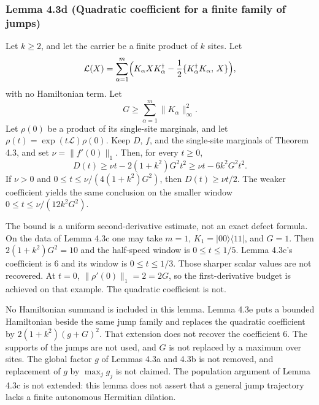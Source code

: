 \documentclass[
  11pt,
]{article}
\begin{document}
\subsubsection{Lemma 4.3d (Quadratic coefficient for a finite family of jumps)}\label{lemma-4.3d-quadratic-coefficient-for-a-finite-family-of-jumps}

Let \(k\ge 2\), and let the carrier be a finite product of \(k\) sites. Let
\[
\mathcal L(X)
=\sum_{\alpha=1}^{m}
\Bigl(
K_\alpha X K_\alpha^\dagger
-\frac12\{K_\alpha^\dagger K_\alpha,\,X\}
\Bigr),
\]
with no Hamiltonian term. Let
\[
G\ge\sum_{\alpha=1}^{m}\|K_\alpha\|_\infty^2.
\]
Let \(\rho(0)\) be a product of its single-site marginals, and let
\(\rho(t)=\exp(t\mathcal L)\rho(0)\). Keep \(D\), \(f\), and the
single-site marginals of Theorem 4.3, and set
\(\nu=\|f'(0)\|_1\). Then, for every \(t\ge 0\),
\[
D(t)
\ge\nu t-2(1+k^2)G^2t^2
\ge\nu t-6k^2G^2t^2.
\]
If \(\nu>0\) and \(0\le t\le\nu/(4(1+k^2)G^2)\), then
\(D(t)\ge\nu t/2\). The weaker coefficient yields the same conclusion
on the smaller window \(0\le t\le\nu/(12k^2G^2)\).

The bound is a uniform second-derivative estimate, not an exact defect
formula. On the data of Lemma 4.3c one may take \(m=1\),
\(K_1=|00\rangle\langle11|\), and \(G=1\). Then
\(2(1+k^2)G^2=10\) and the half-speed window is \(0\le t\le 1/5\).
Lemma 4.3c's coefficient is \(6\) and its window is \(0\le t\le 1/3\).
Those sharper scalar values are not recovered. At \(t=0\),
\(\|\rho'(0)\|_1=2=2G\), so the first-derivative budget is achieved on
that example. The quadratic coefficient is not.

No Hamiltonian summand is included in this lemma. Lemma 4.3e puts a
bounded Hamiltonian beside the same jump family and replaces the
quadratic coefficient by \(2(1+k^2)(g+G)^2\). That extension does not
recover the coefficient \(6\). The supports of the jumps are not
used, and \(G\) is not replaced by a maximum over sites. The global
factor \(g\) of Lemmas 4.3a and 4.3b is not removed, and replacement of
\(g\) by \(\max_j g_j\) is not claimed. The population argument of
Lemma 4.3c is not extended: this lemma does not assert that a general
jump trajectory lacks a finite autonomous Hermitian dilation.
\end{document}

